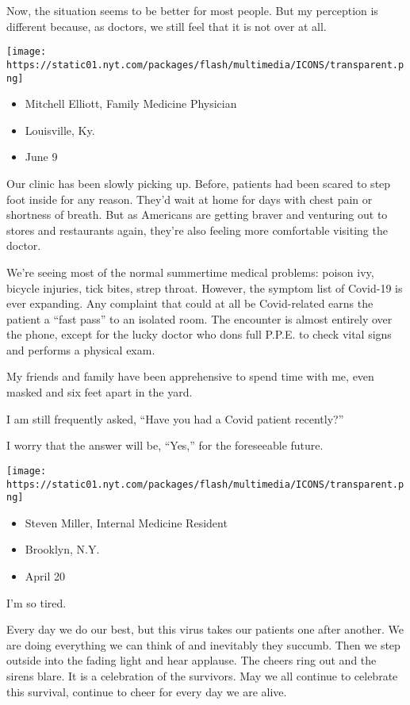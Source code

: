 Now, the situation seems to be better for most people. But my perception
is different because, as doctors, we still feel that it is not over at
all.

\texttt{[image: https://static01.nyt.com/packages/flash/multimedia/ICONS/transparent.png]}

\begin{itemize}
\tightlist
\item
  Mitchell Elliott, Family Medicine Physician
\item
  Louisville, Ky.
\item
  June 9
\end{itemize}

Our clinic has been slowly picking up. Before, patients had been scared
to step foot inside for any reason. They'd wait at home for days with
chest pain or shortness of breath. But as Americans are getting braver
and venturing out to stores and restaurants again, they're also feeling
more comfortable visiting the doctor.

We're seeing most of the normal summertime medical problems: poison ivy,
bicycle injuries, tick bites, strep throat. However, the symptom list of
Covid-19 is ever expanding. Any complaint that could at all be
Covid-related earns the patient a ``fast pass'' to an isolated room. The
encounter is almost entirely over the phone, except for the lucky doctor
who dons full P.P.E. to check vital signs and performs a physical exam.

My friends and family have been apprehensive to spend time with me, even
masked and six feet apart in the yard.

I am still frequently asked, ``Have you had a Covid patient recently?''

I worry that the answer will be, ``Yes,'' for the foreseeable future.

\texttt{[image: https://static01.nyt.com/packages/flash/multimedia/ICONS/transparent.png]}

\begin{itemize}
\tightlist
\item
  Steven Miller, Internal Medicine Resident
\item
  Brooklyn, N.Y.
\item
  April 20
\end{itemize}

I'm so tired.

Every day we do our best, but this virus takes our patients one after
another. We are doing everything we can think of and inevitably they
succumb. Then we step outside into the fading light and hear applause.
The cheers ring out and the sirens blare. It is a celebration of the
survivors. May we all continue to celebrate this survival, continue to
cheer for every day we are alive.


